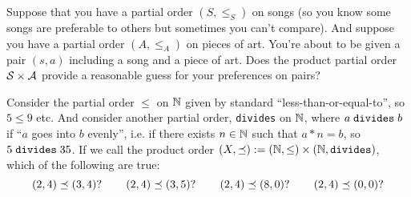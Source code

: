 \documentclass[CT4S-EN-RU]{subfiles}
\begin{document}
\begin{exampleRUS}\label{ex:product of preorders}
\end{exampleRUS}

\begin{exerciseENG}
Suppose that you have a partial order $(S,\leq_S)$ on songs (so you know some songs are preferable to others but sometimes you can't compare). And suppose you have a partial order $(A,\leq_A)$ on pieces of art. You're about to be given a pair $(s,a)$ including a song and a piece of art. Does the product partial order $\mathcal{S}\times\mathcal{A}$ provide a reasonable guess for your preferences on pairs?  
\end{exerciseENG}

\begin{exerciseRUS}
\end{exerciseRUS}

\begin{exerciseENG}\label{exc:divides as po}
Consider the partial order $\leq$ on ${\mathbb N}$ given by standard “less-than-or-equal-to”, so $5\leq 9$ etc. And consider another partial order, {\tt divides} on ${\mathbb N}$, where $a\;{\tt divides}\;b$ if “$a$ goes into $b$ evenly”, i.e. if there exists $n\in{\mathbb N}$ such that $a*n=b$, so $5\;{\tt divides}\;35$. If we call the product order $(X,\preceq):=({\mathbb N},\leq)\times({\mathbb N},{\tt divides})$, which of the following are true: 
$$(2,4)\preceq(3,4)? \hspace{.3in} (2,4)\preceq(3,5)?\hspace{.3in} (2,4)\preceq (8,0)?\hspace{.3in} (2,4)\preceq(0,0)?$$
\end{exerciseENG}

\begin{exerciseRUS}\label{exc:divides as po}
\end{exerciseRUS}
\end{document}
